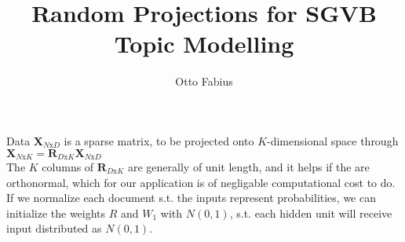 \documentclass{article}
\author{Otto Fabius}
\title{Random Projections for SGVB Topic Modelling}
\begin{document}
\maketitle

Data $\mathbf{X}_{N\text{x}D}$ is a sparse matrix, to be projected onto $K$-dimensional space through $\mathbf{X}_{N\text{x}K} = \mathbf{R}_{D\text{x}K}\mathbf{X}_{N\text{x}D}$
\\
The $K$ columns of $\mathbf{R}_{D\text{x}K}$ are generally of unit length, and it helps if the are orthonormal, which for our application is of negligable computational cost to do. If we normalize each document s.t. the inputs represent probabilities, we can initialize the weights $R$ and $W_1$ with $N(0,1)$, s.t. each hidden unit will receive input distributed as $N(0,1)$. 
\end{document}
